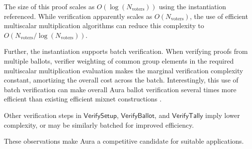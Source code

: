 \documentclass{article}
\newcommand{\func}[1]{\mathsf{#1}}
\begin{document}
The size of this proof scales as $O(\log(N_{\text{voters}}))$ using the instantiation referenced.
While verification apparently scales as $O(N_{\text{voters}})$, the use of efficient multiscalar multiplication algorithms \cite{pippenger} can reduce this complexity to $O(N_{\text{voters}}/\log(N_{\text{voters}}))$.

Further, the instantiation supports batch verification.
When verifying proofs from multiple ballots, verifier weighting of common group elements in the required multiscalar multiplication evaluation makes the marginal verification complexity constant, amortizing the overall cost across the batch.
Interestingly, this use of batch verification can make overall Aura ballot verification several times more efficient than existing efficient mixnet constructions \cite{efficient_shuffle,groth_shuffle}.

Other verification steps in $\func{VerifySetup}$, $\func{VerifyBallot}$, and $\func{VerifyTally}$ imply lower complexity, or may be similarly batched for improved efficiency.

These observations make Aura a competitive candidate for suitable applications.




\end{document}
